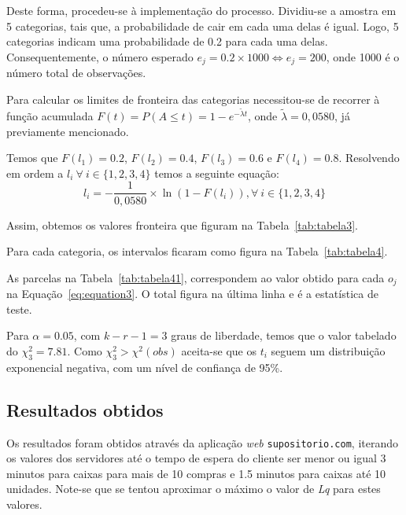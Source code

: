 Deste forma, procedeu-se à implementação do processo. Dividiu-se a amostra em
5 categorias, tais que, a probabilidade de cair em cada uma delas é igual. Logo,
5 categorias indicam uma probabilidade de 0.2 para cada uma delas.
Consequentemente, o número esperado $e_j=0.2\times 1000 \iff e_j=200$, onde 1000
é o número total de observações.\

Para calcular os limites de fronteira das categorias necessitou-se de recorrer
à função acumulada $F(t)=P(A\leq t)=1-e^{-\tilde{\lambda}t}$, onde
$\tilde{\lambda}=0,0580$, já previamente mencionado.

Temos que $F(l_1) = 0.2$, $F(l_2) = 0.4$, $F(l_3) = 0.6$ e $F(l_4) = 0.8$.
Resolvendo em ordem a $l_i~\forall~i \in \{1,2,3,4\}$ temos a seguinte equação:
\begin{equation}
l_i=-\dfrac{1}{0,0580}\times \ln(1-F(l_i)), \forall~i \in \{1,2,3,4\}
	\label{eq:equation4}
\end{equation}

Assim, obtemos os valores fronteira que figuram na Tabela~\ref{tab:tabela3}.



\newpage 

Para cada categoria, os intervalos ficaram como figura na
Tabela~\ref{tab:tabela4}.




As parcelas na Tabela~\ref{tab:tabela41}, correspondem ao valor obtido para cada
$o_j$ na Equação~\ref{eq:equation3}. O total figura na última linha
e é a estatística de teste. 



Para $\alpha=0.05$, com $k-r-1=3$ graus de liberdade, temos que o valor tabelado
do $\chi^2_3=7.81$. Como $\chi^2_3>\chi^2(obs)$ aceita-se que os $t_i$ seguem um
distribuição exponencial negativa, com um nível de confiança de 95\%.


\newpage
\subsection{Resultados obtidos}

Os resultados foram obtidos através da aplicação \emph{web}
\verb|supositorio.com|, iterando os valores dos servidores até o tempo de espera
do cliente ser menor ou igual 3 minutos para caixas para mais de 10 compras
e 1.5 minutos para caixas até 10 unidades. Note-se que se tentou aproximar
o máximo o valor de \emph{Lq} para estes valores. 

